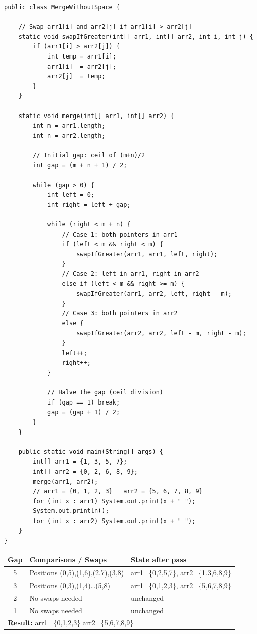 \documentclass[12pt,a4paper,oneside]{book}
\begin{document}
\begin{lstlisting}[caption={Merge Without Extra Space --- Gap Method, O(n log n) time O(1) space}]
public class MergeWithoutSpace {

    // Swap arr1[i] and arr2[j] if arr1[i] > arr2[j]
    static void swapIfGreater(int[] arr1, int[] arr2, int i, int j) {
        if (arr1[i] > arr2[j]) {
            int temp = arr1[i];
            arr1[i]  = arr2[j];
            arr2[j]  = temp;
        }
    }

    static void merge(int[] arr1, int[] arr2) {
        int m = arr1.length;
        int n = arr2.length;

        // Initial gap: ceil of (m+n)/2
        int gap = (m + n + 1) / 2;

        while (gap > 0) {
            int left = 0;
            int right = left + gap;

            while (right < m + n) {
                // Case 1: both pointers in arr1
                if (left < m && right < m) {
                    swapIfGreater(arr1, arr1, left, right);
                }
                // Case 2: left in arr1, right in arr2
                else if (left < m && right >= m) {
                    swapIfGreater(arr1, arr2, left, right - m);
                }
                // Case 3: both pointers in arr2
                else {
                    swapIfGreater(arr2, arr2, left - m, right - m);
                }
                left++;
                right++;
            }

            // Halve the gap (ceil division)
            if (gap == 1) break;
            gap = (gap + 1) / 2;
        }
    }

    public static void main(String[] args) {
        int[] arr1 = {1, 3, 5, 7};
        int[] arr2 = {0, 2, 6, 8, 9};
        merge(arr1, arr2);
        // arr1 = {0, 1, 2, 3}   arr2 = {5, 6, 7, 8, 9}
        for (int x : arr1) System.out.print(x + " ");
        System.out.println();
        for (int x : arr2) System.out.print(x + " ");
    }
}
\end{lstlisting}

\begin{dryrun}[arr1 = \{1,3,5,7\}, arr2 = \{0,2,6,8,9\}, combined size = 9]
\begin{center}
\begin{tabular}{cp{4.5cm}p{4cm}}
\toprule
\textbf{Gap} & \textbf{Comparisons / Swaps} & \textbf{State after pass}\\
\midrule
5 & Positions (0,5),(1,6),(2,7),(3,8) & arr1=\{0,2,5,7\}, arr2=\{1,3,6,8,9\}\\
3 & Positions (0,3),(1,4)\ldots(5,8) & arr1=\{0,1,2,3\}, arr2=\{5,6,7,8,9\}\\
2 & No swaps needed & unchanged\\
1 & No swaps needed & unchanged\\
\midrule
\multicolumn{3}{l}{\textbf{Result:} arr1=\{0,1,2,3\} \quad arr2=\{5,6,7,8,9\}}\\
\bottomrule
\end{tabular}
\end{center}
\end{dryrun}
\end{document}
